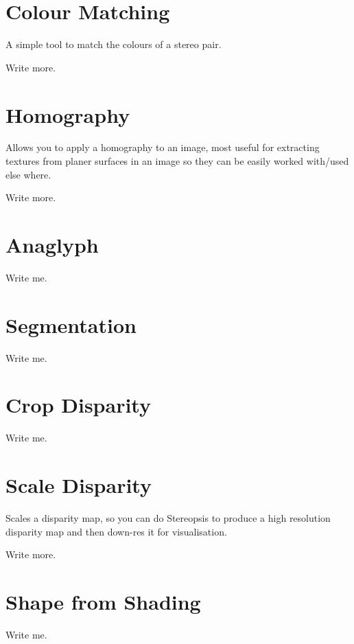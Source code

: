 \documentclass[10pt,a4paper,twoside]{article}
\begin{document}



\section{Colour Matching}
A simple tool to match the colours of a stereo pair.

Write more.



\section{Homography}
Allows you to apply a homography to an image, most useful for extracting textures from planer surfaces in an image so they can be easily worked with/used else where.

Write more.



\section{Anaglyph}
Write me.



\section{Segmentation}
Write me.



\section{Crop Disparity}
Write me.



\section{Scale Disparity}
Scales a disparity map, so you can do Stereopsis to produce a high resolution disparity map and then down-res it for visualisation.

Write more.



\section{Shape from Shading}
Write me.
\end{document}
